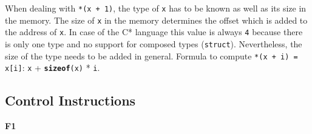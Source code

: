 \par{
	\noindent
	When dealing with \texttt{*(x + 1)}, the type of \texttt{x} has to be known as well as its size in the memory. The size of \texttt{x} in the memory determines the offset which is added to the address of \texttt{x}. In case of the C* language this value is always \texttt{4} because there is only one type and no support for composed types (\texttt{struct}). Nevertheless, the size of the type needs to be added in general. \newline
	Formula to compute \texttt{*(x + i) = x[i]}: \texttt{x} + \texttt{\textbf{sizeof}(x)} * \texttt{i}.
}

\subsection*{Control Instructions}

\par{
    \noindent
    \textbf{F1}
}

